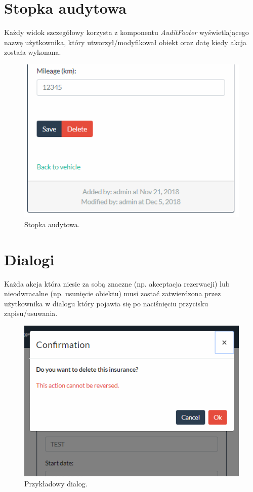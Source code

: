 \documentclass[eng,printmode,openany]{mgr}
\begin{document}
	\newpage
	\section{Stopka audytowa}
	Każdy widok szczegółowy korzysta z komponentu \textit{AuditFooter} wyświetlającego nazwę użytkownika, który utworzył/modyfikował obiekt oraz datę kiedy akcja została wykonana.
	
	\begin{figure}[H]
		\centering
		\includegraphics[scale=0.5]{images/insurance_footer.png}
		\caption{Stopka audytowa.}
	\end{figure}

	\section{Dialogi}
	Każda akcja która niesie za sobą znaczne (np. akceptacja rezerwacji) lub nieodwracalne (np. usunięcie obiektu) musi zostać zatwierdzona przez użytkownika w dialogu który pojawia się po naciśnięciu przycisku zapisu/usuwania.
	
	\begin{figure}[H]
		\centering
		\includegraphics[scale=0.7]{images/insurance_confirmation.png}
		\caption{Przykładowy dialog.}
	\end{figure}
	
\end{document}
